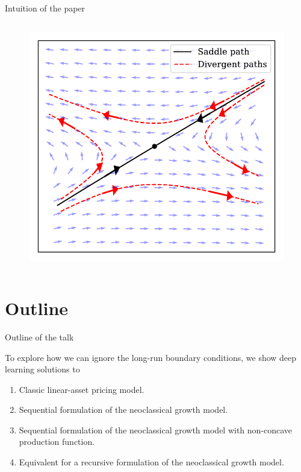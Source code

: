 \documentclass[aspectratio=169,10pt]{beamer}
\begin{document}
\begin{frame}{Intuition of the paper}
\begin{columns}
\begin{column}{0.4\textwidth}
\begin{figure}[t!]
			\centering
			\includegraphics[width=\textwidth]{figs/saddle_path.pdf}
			\vspace{-7mm}
		\end{figure}
		\end{column}
	\end{columns}
\end{frame}

\section{Outline}

\begin{frame}{Outline of the talk}
	
	To explore how we can ignore the long-run boundary conditions, we show deep learning solutions to
	\begin{enumerate}
		\item Classic linear-asset pricing model.\vspace{0.1in}
		\item Sequential formulation of the neoclassical growth model.\vspace{0.1in}
		\item Sequential formulation of the neoclassical growth model with non-concave production function.\vspace{0.1in}
		\item Equivalent for a recursive formulation of the neoclassical growth model.\vspace{0.1in}
		
	\end{enumerate}
\end{frame}
\end{document}
